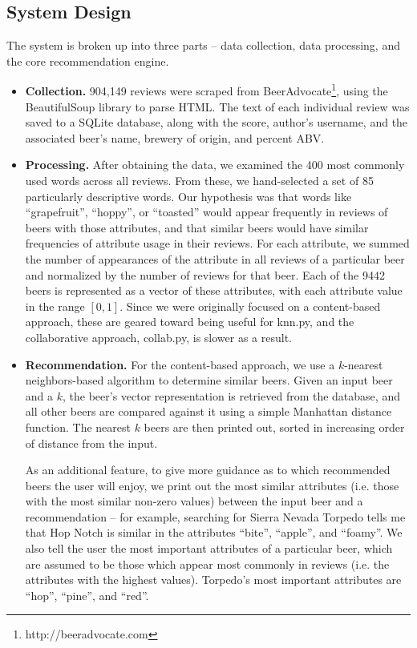 \documentclass[11pt]{article}
\begin{document}
\subsection*{System Design}
The system is broken up into three parts -- data collection, data processing, and the core recommendation engine.
\begin{itemize}
\item \textbf{Collection.} 904,149 reviews were scraped from BeerAdvocate\footnote{http://beeradvocate.com}, using the BeautifulSoup library to parse HTML. The text of each individual review was saved to a SQLite database, along with the score, author's username, and the associated beer's name, brewery of origin, and percent ABV.
\item \textbf{Processing.} After obtaining the data, we examined the 400 most commonly used words across all reviews. From these, we hand-selected a set of 85 particularly descriptive words. Our hypothesis was that words like ``grapefruit'', ``hoppy'', or ``toasted'' would appear frequently in reviews of beers with those attributes, and that similar beers would have similar frequencies of attribute usage in their reviews. For each attribute, we summed the number of appearances of the attribute in all reviews of a particular beer and normalized by the number of reviews for that beer. Each of the 9442 beers is represented as a vector of these attributes, with each attribute value in the range $[0, 1]$. Since we were originally focused on a content-based approach, these are geared toward being useful for knn.py, and the collaborative approach, collab.py, is slower as a result.
\item \textbf{Recommendation.} For the content-based approach, we use a $k$-nearest neighbors-based algorithm to determine similar beers. Given an input beer and a $k$, the beer's vector representation is retrieved from the database, and all other beers are compared against it using a simple Manhattan distance function. The nearest $k$ beers are then printed out, sorted in increasing order of distance from the input. 

As an additional feature, to give more guidance as to which recommended beers the user will enjoy, we print out the most similar attributes (i.e. those with the most similar non-zero values) between the input beer and a recommendation -- for example, searching for Sierra Nevada Torpedo tells me that Hop Notch is similar in the attributes ``bite'', ``apple'', and ``foamy''. We also tell the user the most important attributes of a particular beer, which are assumed to be those which appear most commonly in reviews (i.e. the attributes with the highest values). Torpedo's most important attributes are ``hop'', ``pine'', and ``red''.


\end{itemize}
\end{document}
